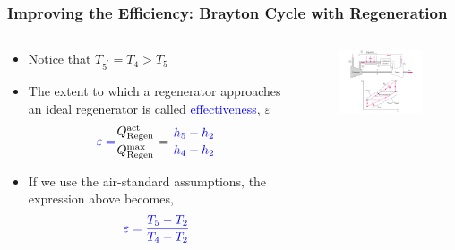 \documentclass[10pt,compress]{beamer}
\newcommand{\frc}{\displaystyle\frac}
\begin{document}
\begin{frame}
 \frametitle{Improving the Efficiency: Brayton Cycle with Regeneration}
 \begin{columns}
  \begin{column}[c]{0.4\linewidth} 
 \begin{itemize}
  \item <1-> Notice that $T_{5^{\prime}}=T_{4}>T_{5}$
  \item <2-> The extent to which a regenerator approaches an ideal regenerator is called \textcolor{blue}{effectiveness}, $\varepsilon$
   \begin{displaymath}
     \textcolor{blue}{\varepsilon=}\frc{Q_{\text{Regen}}^{\text{act}}}{Q_{\text{Regen}}^{\text{max}}} = \textcolor{blue}{\frc{h_{5}-h_{2}}{h_{4}-h_{2}}}
    \end{displaymath}
  \item <3-> If we use the air-standard assumptions, the expression above becomes,
   \begin{displaymath}
     \textcolor{blue}{\varepsilon= \frc{T_{5}-T_{2}}{T_{4}-T_{2}}}
    \end{displaymath}   
 \end{itemize}
  \end{column}
  \begin{column}[c]{0.6\linewidth}
    \begin{center}
   \begin{figure}%
     \includegraphics[height=6.cm,width=6.5cm,clip]{./Pics/Brayton_cycle4}
   \end{figure}  
    \end{center}
  \end{column}  
 \end{columns}

\end{frame}
\end{document}
